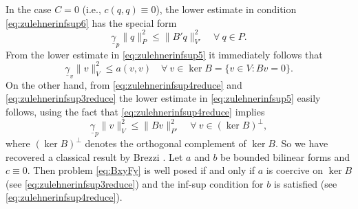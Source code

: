\begin{remark}
In the case $C=0$ (i.e., $c(q,q)\equiv0$), the lower estimate in condition \eqref{eq:zulehnerinfsup6} has the special form
\begin{equation}\label{eq:zulehnerinfsup4reduce}
\underline{\gamma}_p\|q\|_P^2\leq \|B'q\|_{V'}^2\quad\forall~q\in P.
\end{equation}
From the lower estimate in \eqref{eq:zulehnerinfsup5} it immediately follows that
\begin{equation}\label{eq:zulehnerinfsup3reduce}
\underline{\gamma}_v\|v\|_V^2\leq a(v,v)\quad\forall~v\in \ker B=\{v\in V: Bv=0\}.
\end{equation}
On the other hand, from \eqref{eq:zulehnerinfsup4reduce} and \eqref{eq:zulehnerinfsup3reduce} the lower estimate in \eqref{eq:zulehnerinfsup5} easily follows, using
the fact that \eqref{eq:zulehnerinfsup4reduce} implies
\[
\underline{\gamma}_p\|v\|_V^2\leq \|Bv\|_{P'}^2\quad\forall~v\in (\ker B)^{\perp},
\]
where $ (\ker B)^{\perp}$ denotes the orthogonal complement of $\ker B$. 
So we have recovered a classical result by Brezzi \cite{Brezzi1974,BoffiBrezziFortin2013}. Let $a$ and $b$ be bounded bilinear forms and $c\equiv0$. Then problem \eqref{eq:BxyFy} is well posed if and only if $a$ is coercive on $\ker B$ (see \eqref{eq:zulehnerinfsup3reduce}) and the inf-sup condition for $b$ is satisfied (see \eqref{eq:zulehnerinfsup4reduce}).
\end{remark}



